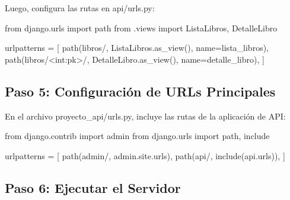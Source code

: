 \documentclass[
  a4paper,
  DIV=11,
  numbers=noendperiod,
  onepage,
  openany]{scrreprt}
\newenvironment{Shaded}{\begin{snugshade}}{\end{snugshade}}
\newcommand{\ImportTok}[1]{\textcolor[rgb]{0.00,0.46,0.62}{#1}}
\newcommand{\NormalTok}[1]{\textcolor[rgb]{0.00,0.23,0.31}{#1}}
\newcommand{\OperatorTok}[1]{\textcolor[rgb]{0.37,0.37,0.37}{#1}}
\newcommand{\StringTok}[1]{\textcolor[rgb]{0.13,0.47,0.30}{#1}}
\begin{document}
Luego, configura las rutas en api/urls.py:

\begin{Shaded}
\begin{Highlighting}[]
\ImportTok{from}\NormalTok{ django.urls }\ImportTok{import}\NormalTok{ path}
\ImportTok{from}\NormalTok{ .views }\ImportTok{import}\NormalTok{ ListaLibros, DetalleLibro}

\NormalTok{urlpatterns }\OperatorTok{=}\NormalTok{ [}
\NormalTok{    path(}\StringTok{\textquotesingle{}libros/\textquotesingle{}}\NormalTok{, ListaLibros.as\_view(), name}\OperatorTok{=}\StringTok{\textquotesingle{}lista\_libros\textquotesingle{}}\NormalTok{),}
\NormalTok{    path(}\StringTok{\textquotesingle{}libros/\textless{}int:pk\textgreater{}/\textquotesingle{}}\NormalTok{, DetalleLibro.as\_view(), name}\OperatorTok{=}\StringTok{\textquotesingle{}detalle\_libro\textquotesingle{}}\NormalTok{),}
\NormalTok{]}
\end{Highlighting}
\end{Shaded}

\subsection{Paso 5: Configuración de URLs
Principales}\label{paso-5-configuraciuxf3n-de-urls-principales}

En el archivo proyecto\_api/urls.py, incluye las rutas de la aplicación
de API:

\begin{Shaded}
\begin{Highlighting}[]
\ImportTok{from}\NormalTok{ django.contrib }\ImportTok{import}\NormalTok{ admin}
\ImportTok{from}\NormalTok{ django.urls }\ImportTok{import}\NormalTok{ path, include}

\NormalTok{urlpatterns }\OperatorTok{=}\NormalTok{ [}
\NormalTok{    path(}\StringTok{\textquotesingle{}admin/\textquotesingle{}}\NormalTok{, admin.site.urls),}
\NormalTok{    path(}\StringTok{\textquotesingle{}api/\textquotesingle{}}\NormalTok{, include(}\StringTok{\textquotesingle{}api.urls\textquotesingle{}}\NormalTok{)),}
\NormalTok{]}
\end{Highlighting}
\end{Shaded}

\subsection{Paso 6: Ejecutar el
Servidor}\label{paso-6-ejecutar-el-servidor}
\end{document}

